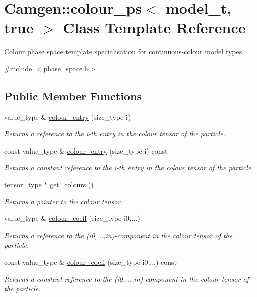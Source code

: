 \hypertarget{a00091}{\section{Camgen\-:\-:colour\-\_\-ps$<$ model\-\_\-t, true $>$ Class Template Reference}
\label{a00091}
}


Colour phase space template specialisation for continuous-\/colour model types.  




{\ttfamily \#include $<$phase\-\_\-space.\-h$>$}

\subsection*{Public Member Functions}
\begin{DoxyCompactItemize}
\item 
value\-\_\-type \& \hyperlink{a00091_afd04e91a928a45bbbadb962002930ff9}{colour\-\_\-entry} (size\-\_\-type i)
\begin{DoxyCompactList}\small\item\em Returns a reference to the i-\/th entry in the colour tensor of the particle. \end{DoxyCompactList}\item 
const value\-\_\-type \& \hyperlink{a00091_a5685651ee32f219b20b0972f5c232e61}{colour\-\_\-entry} (size\-\_\-type i) const 
\begin{DoxyCompactList}\small\item\em Returns a constant reference to the i-\/th entry in the colour tensor of the particle. \end{DoxyCompactList}\item 
\hypertarget{a00091_af4e1d64a5c3829b272ba5ed04915a7ac}{\hyperlink{a00526}{tensor\-\_\-type} $\ast$ \hyperlink{a00091_af4e1d64a5c3829b272ba5ed04915a7ac}{get\-\_\-colours} ()}\label{a00091_af4e1d64a5c3829b272ba5ed04915a7ac}

\begin{DoxyCompactList}\small\item\em Returns a pointer to the colour tensor. \end{DoxyCompactList}\item 
value\-\_\-type \& \hyperlink{a00091_ab9cf57138337e10b4c1fb71754e0ead2}{colour\-\_\-coeff} (size\-\_\-type i0,...)
\begin{DoxyCompactList}\small\item\em Returns a reference to the (i0,...,in)-\/component in the colour tensor of the particle. \end{DoxyCompactList}\item 
const value\-\_\-type \& \hyperlink{a00091_aedfdfdeabd064fbb05a815f0906607c0}{colour\-\_\-coeff} (size\-\_\-type i0,...) const 
\begin{DoxyCompactList}\small\item\em Returns a constant reference to the (i0,...,in)-\/component in the colour tensor of the particle. \end{DoxyCompactList}\end{DoxyCompactItemize}


